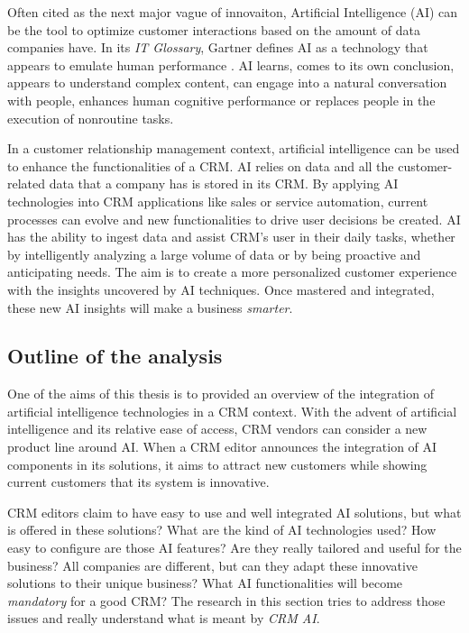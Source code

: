 Often cited as the next major vague of innovaiton, Artificial Intelligence (AI) can be the tool to optimize customer interactions based on the amount of data companies have. In its \textit{IT Glossary}, Gartner defines AI as a technology that appears to emulate human performance \cite{gartner-glossary}. AI learns, comes to its own conclusion, appears to understand complex content, can engage into a natural conversation with people, enhances human cognitive performance or replaces people in the execution of nonroutine tasks.

In a customer relationship management context, artificial intelligence can be used to enhance the functionalities of a CRM. AI relies on data and all the customer-related data that a company has is stored in its CRM. By applying AI technologies into CRM applications like sales or service automation, current processes can evolve and new functionalities to drive user decisions be created. AI has the ability to ingest data and assist CRM's user in their daily tasks, whether by intelligently analyzing a large volume of data or by being proactive and anticipating needs. The aim is to create a more personalized customer experience with the insights uncovered by AI techniques. Once mastered and integrated, these new AI insights will make a business \textit{smarter}.


\subsection{Outline of the analysis}
One of the aims of this thesis is to provided an overview of the integration of artificial intelligence technologies in a CRM context. With the advent of artificial intelligence and its relative ease of access, CRM vendors can consider a new product line around AI. When a CRM editor announces the integration of AI components in its solutions, it aims to attract new customers while showing current customers that its system is innovative.

CRM editors claim to have easy to use and well integrated AI solutions, but what is offered in these solutions? What are the kind of AI technologies used? How easy to configure are those AI features? Are they really tailored and useful for the business? All companies are different, but can they adapt these innovative solutions to their unique business? What AI functionalities will become \textit{mandatory} for a good CRM? The research in this section tries to address those issues and really understand what is meant by \textit{CRM AI}.


